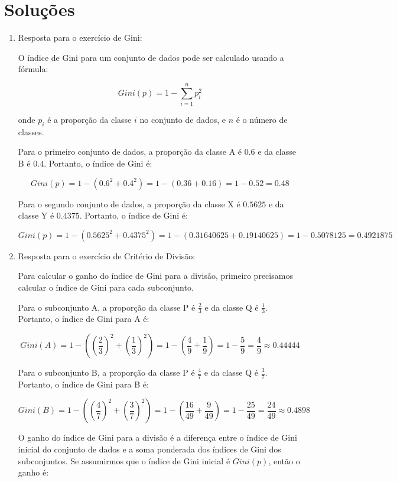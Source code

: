 \documentclass[12pt,a4paper, brazil]{article}
\begin{document}
\section{Soluções}

\begin{enumerate}
\item Resposta para o exercício de Gini:

O índice de Gini para um conjunto de dados pode ser calculado usando a fórmula: 

$$
Gini(p) = 1 - \sum_{i=1}^{n} p_i^2
$$

onde $p_i$ é a proporção da classe $i$ no conjunto de dados, e $n$ é o número de classes. 

Para o primeiro conjunto de dados, a proporção da classe A é $0.6$ e da classe B é $0.4$. Portanto, o índice de Gini é:

$$
Gini(p) = 1 - (0.6^2 + 0.4^2) = 1 - (0.36 + 0.16) = 1 - 0.52 = 0.48
$$

Para o segundo conjunto de dados, a proporção da classe X é $0.5625$ e da classe Y é $0.4375$. Portanto, o índice de Gini é:

$$
Gini(p) = 1 - (0.5625^2 + 0.4375^2) = 1 - (0.31640625 + 0.19140625) = 1 - 0.5078125 = 0.4921875
$$

\item Resposta para o exercício de Critério de Divisão:

Para calcular o ganho do índice de Gini para a divisão, primeiro precisamos calcular o índice de Gini para cada subconjunto.

Para o subconjunto A, a proporção da classe P é $\frac{2}{3}$ e da classe Q é $\frac{1}{3}$. Portanto, o índice de Gini para A é:

$$
Gini(A) = 1 - \left(\left(\frac{2}{3}\right)^2 + \left(\frac{1}{3}\right)^2\right) = 1 - \left(\frac{4}{9} + \frac{1}{9}\right) = 1 - \frac{5}{9} = \frac{4}{9} \approx 0.44444
$$

Para o subconjunto B, a proporção da classe P é $\frac{4}{7}$ e da classe Q é $\frac{3}{7}$. Portanto, o índice de Gini para B é:

$$
Gini(B) = 1 - \left(\left(\frac{4}{7}\right)^2 + \left(\frac{3}{7}\right)^2\right) = 1 - \left(\frac{16}{49} + \frac{9}{49}\right) = 1 - \frac{25}{49} = \frac{24}{49} \approx 0.4898
$$

O ganho do índice de Gini para a divisão é a diferença entre o índice de Gini inicial do conjunto de dados e a soma ponderada dos índices de Gini dos subconjuntos. Se assumirmos que o índice de Gini inicial é $Gini(p)$, então o ganho é:


\end{enumerate}
\end{document}
